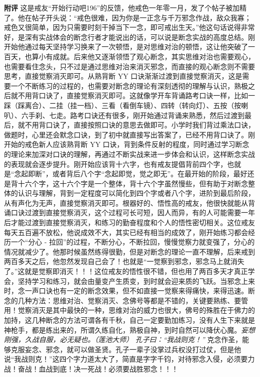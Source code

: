 \begin{case}
    \textbf{附评} 这是戒友“开始行动吧196”的反馈，他戒色一年零一月，发了个帖子被加精了。他在帖子开头说：“戒色很难，因为你是一正念与千万邪念作战，敌众我寡；戒色又很简单，因为只需要时刻干掉当下一念，即可戒出生天。”他这句话说得非常好，是深有实战体会的断念行者才能说出的话，可以说是断念实战的高度总结。刚开始他通过每天坚持学习换来了一次顿悟，是对思维对治的顿悟，这让他突破了一百天，也算小有成就。后来他又逐渐领悟了观心断念，其实思维对治也需要观心，也需要看住念头，只不过是通过思维对治来消灭邪念，而直接的观心断念则不需要思考，直接觉察消灭即可。从熟背断 YY 口诀渐渐过渡到直接觉察消灭，这是需要一个不断练习的过程的，也需要对断念的理论有深刻透彻的理解与认识，熟极之后就不用背口诀了，直接觉察消灭即可。这就像学开车背诵路考口诀一样，比如一踩（踩离合）、二挂（挂一档）、三看（看倒车镜）、四转（转向灯）、五按（按喇叭）、六手刹、七走。路考口诀还有很多，刚开始通过背诵来熟悉，然后过渡到最后，就不用背口诀了，直接按照口诀的意思去做即可。小学时我们背过乘法口诀，做题时，心里还会默念口诀，到了初中就直接写出答案了，已经不用背口诀了。刚开始的戒色新人应该熟背断 YY 口诀，背到条件反射的程度，同时通过学习断念的理论来加深对口诀的理解，再通过不断实战来进一步体会和认识，这样断念实战的表现就会逐步提升。刚开始应该背十六字，也有戒友提倡背前四个字，也就是“念起即断”，或者背后八个字“念起即觉，觉之即无”。在最开始的阶段，最好还是背十六个字，这十六个字是一个整体，背十六个字虽然慢些，但有助于对断念整体的认识与理解，背到一定程度可以简化到四个字或者八个字，进阶到最后阶段，从有声化为无声，直接觉察消灭即可。根器好的、悟性高的戒友，他很快就能从背诵口诀过渡到直接觉察消灭，这个过程可长可短，因人而异，有的人可能需要一年后才能过渡到直接觉察消灭，和练习的勤奋程度和个人的悟性密切相关。这位戒友每天五百遍不放松，他说成效不大，其实已经有相当的成效了，刚开始练习都会经历一个“分心 - 拉回”的过程，不断分心，不断拉回，慢慢觉察力就变强了，分心的情况就减少了。他那时候虽然练得很勤，但是对断念的理论一直不理解，后来戒到两百多天之后，他忽然发现自己会了！也就是“一觉察到邪念，邪念马上就消失了。”这就是觉察即消灭！！！这位戒友的悟性很不错，但也用了两百多天才真正学会，坚持学习和练习，就会由量变产生质变，到时就会迎来质的飞跃。当邪念上来时，念一声口诀也有一定的断念效果，但不如直接一觉察来得痛快，来得迅速。断念的几种方法：思维对治、觉察消灭、念佛号等都是不错的，关键要熟练、要管用！觉察消灭是其中最快的一种，思维对治的威力也很大，佛号的殊胜在于佛力的加持，这几种断念的方法可谓各有千秋，自己一定要勤加练习，没有人生下来就是神枪手，都是练出来的，所谓久练自化，熟极自神，到时自然可以降伏心魔。\textit{妄想刚强，久战自服，必无疑也。（莲池大师）} \textit{孔子曰：“我战则克！”} 克念作圣，能够克服妄念、邪念，就可以做圣贤。孔子一辈子没掌过兵权没打过仗，但是他说“我战则克！”这四个字力道太大了，简直是字字千钧，对待邪念入侵，必须要力战！奋战！血战到底！决一死战！必须要战胜邪念！！！
\end{case}

